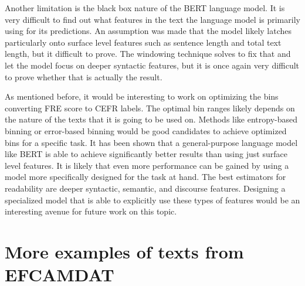 \documentclass[11pt,a4paper]{article}
\begin{document}
Another limitation is the black box nature of the BERT language model. It is
very difficult to find out what features in the text the language model is
primarily using for its predictions. An assumption was made that the model
likely latches particularly onto surface level features such as sentence length and
total text length, but it difficult to prove. The windowing technique solves to
fix that and let the model focus on deeper syntactic features, but it is once
again very difficult to prove whether that is actually the result.

As mentioned before, it would be interesting to work on optimizing the bins
converting FRE score to CEFR labels. The optimal bin ranges likely depends on
the nature of the texts that it is going to be used on. Methods like
entropy-based binning or error-based binning would be good candidates to
achieve optimized bins for a specific task. It has been shown that a
general-purpose language model like BERT is able to achieve significantly
better results than using just surface level features. It is likely that even
more performance can be gained by using a model more specifically designed for
the task at hand. The best estimators for readability are deeper
syntactic, semantic, and discourse features. Designing a specialized model that
is able to explicitly use these types of features would be an interesting
avenue for future work on this topic.

\printbibliography

\appendix

\section{More examples of texts from EFCAMDAT}
\end{document}
